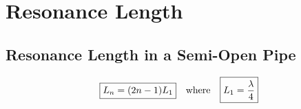 \section{Resonance Length}
%
\subsection{Resonance Length in a Semi-Open Pipe}
%
%
%
%
%
%
%
%
%
%  
\begin{equation}
  \boxed{L_n = (2n-1)L_1}
  \quad\text{\normalsize where}\quad
  \boxed{L_1 = \frac\lambda4}
\end{equation}
%
%
%
%


